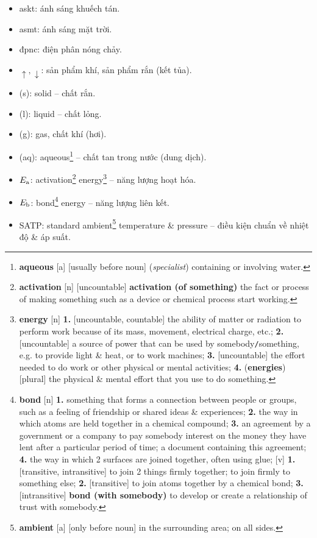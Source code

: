 \documentclass[oneside]{book}
\numberwithin{equation}{section}
\begin{document}
\begin{itemize}
	\item askt: ánh sáng khuếch tán.
	\item asmt: ánh sáng mặt trời.
	\item đpnc: điện phân nóng chảy.
	\item $\uparrow,\downarrow$: sản phẩm khí, sản phẩm rắn (kết tủa).
	\item (s): solid -- chất rắn.
	\item (l): liquid -- chất lỏng.
	\item (g): gas, chất khí (hơi).
	\item (aq): aqueous\footnote{\textbf{aqueous} [a] [usually before noun] (\textit{specialist}) containing or involving water.} -- chất tan trong nước (dung dịch).
	\item $E_{\rm a}$: activation\footnote{\textbf{activation} [n] [uncountable] \textbf{activation (of something)} the fact or process of making something such as a device or chemical process start working.} energy\footnote{\textbf{energy} [n] \textbf{1.} [uncountable, countable] the ability of matter or radiation to perform work because of its mass, movement, electrical charge, etc.; \textbf{2.} [uncountable] a source of power that can be used by somebody\texttt{/}something, e.g. to provide light \& heat, or to work machines; \textbf{3.} [uncountable] the effort needed to do work or other physical or mental activities; \textbf{4.} (\textbf{energies}) [plural] the physical \& mental effort that you use to do something.} -- năng lượng hoạt hóa.
	\item $E_{\rm b}$: bond\footnote{\textbf{bond} [n] \textbf{1.} something that forms a connection between people or groups, such as a feeling of friendship or shared ideas \& experiences; \textbf{2.} the way in which atoms are held together in a chemical compound; \textbf{3.} an agreement by a government or a company to pay somebody interest on the money they have lent after a particular period of time; a document containing this agreement; \textbf{4.} the way in which 2 surfaces are joined together, often using glue; [v] \textbf{1.} [transitive, intransitive] to join 2 things firmly together; to join firmly to something else; \textbf{2.} [transitive] to join atoms together by a chemical bond; \textbf{3.} [intransitive] \textbf{bond (with somebody)} to develop or create a relationship of trust with somebody.} energy -- năng lượng liên kết.
	\item SATP: standard ambient\footnote{\textbf{ambient} [a] [only before noun] in the surrounding area; on all sides.} temperature \& pressure -- điều kiện chuẩn về nhiệt độ \& áp suất.

\end{itemize}
\end{document}
